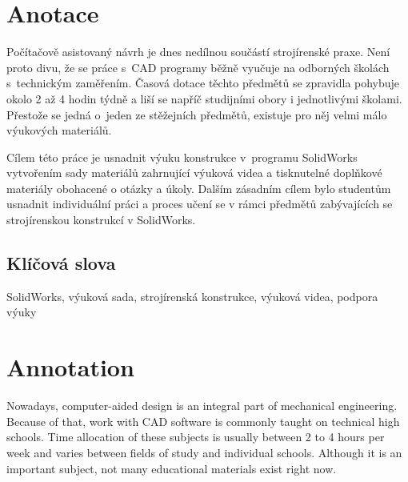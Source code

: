 \documentclass{template/socthesis}
\author{Petr Štourač}
\begin{document}

\maketitle



\makethanks{\B{\textcolor{red}{PŠ: Poděkování sepísnu na závěr.}}}

\pagestyle{empty}

\section*{Anotace}
Počítačově asistovaný návrh je dnes nedílnou součástí strojírenské praxe.
Není proto divu, že se práce s~CAD programy běžně vyučuje na odborných školách s~technickým zaměřením.
Časová dotace těchto předmětů se zpravidla pohybuje okolo 2 až 4 hodin týdně a liší se napříč studijními obory i jednotlivými školami.
Přestože se jedná o~jeden ze stěžejních předmětů, existuje pro něj velmi málo výukových materiálů.

Cílem této práce je usnadnit výuku konstrukce v~programu SolidWorks vytvořením sady materiálů zahrnující výuková videa a tisknutelné doplňkové materiály obohacené o otázky a úkoly.
Dalším zásadním cílem bylo studentům usnadnit individuální práci a proces učení se v rámci předmětů zabývajících se strojírenskou konstrukcí v SolidWorks. 

\subsection*{Klíčová slova}
SolidWorks, výuková sada, strojírenská konstrukce, výuková videa, podpora výuky

\vspace{5mm}

\section*{Annotation}
Nowadays, computer-aided design is an integral part of mechanical engineering.
Because of that, work with CAD software is commonly taught on technical high schools.
Time allocation of these subjects is usually between 2 to 4 hours per week and varies between fields of study and individual schools. 
Although it is an important subject, not many educational materials exist right now.
\end{document}
